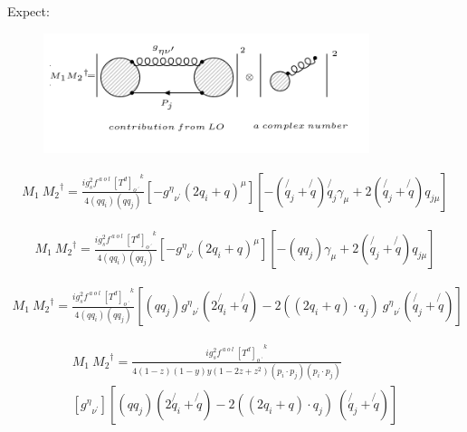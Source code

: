 Expect:
\begin{figure}[h!]
\centering
\includegraphics[width=0.85\textwidth]{images/expectationM1M2daggerggq.png}
\end{figure}
\pagebreak
\begin{equation}
\begin{split}
M_1\:{M_2}^{\dagger}=\frac{ig_s ^2 f^{\:a\:o\:l}\: {[T^d]_{o\:^{\prime}}}^k}{4(qq_i)(qq_j)}
[-{g^{{\eta}}}_{{\nu}^{\prime}}(2q_i +q)^{\mu}]
[-(\not{q_j} + \not{q})\not{q_j}\gamma_{{\mu}} +2(\not{q_j} + \not{q}){q}_{j\mu}]
\end{split}
\end{equation}

\begin{equation}
\begin{split}
M_1\:{M_2}^{\dagger}=\frac{ig_s ^2 f^{\:a\:o\:l}\: {[T^d]_{o\:^{\prime}}}^k}{4(qq_i)(qq_j)}
[-{g^{{\eta}}}_{{\nu}^{\prime}}(2q_i +q)^{\mu}]
[-(qq_j)\gamma_{{\mu}} +2(\not{q_j} + \not{q}){q}_{j\mu}]
\end{split}
\end{equation}

\begin{equation}
\begin{split}
M_1\:{M_2}^{\dagger}=\frac{ig_s ^2 f^{\:a\:o\:l}\: {[T^d]_{o\:^{\prime}}}^k}{4(qq_i)(qq_j)}
[(qq_j){g^{{\eta}}}_{{\nu}^{\prime}}(2\not{q_i} +\not{q})-2((2q_i +q)\cdot{q_j})\:{g^{{\eta}}}_{{\nu}^{\prime}}(\not{q_j} + \not{q})]
\end{split}
\end{equation}

\begin{equation}
\begin{split}
M_1\:{M_2}^{\dagger}=\frac{ig_s ^2 f^{\:a\:o\:l}\: {[T^d]_{o\:^{\prime}}}^k}{4(1-z)(1-y)y(1-2z+z^2)(p_i \cdot p_j)(p_i \cdot p_j)}\\
[{g^{{\eta}}}_{{\nu}^{\prime}}][(qq_j)(2\not{q_i} +\not{q})-2((2q_i +q)\cdot{q_j})\:(\not{q_j} + \not{q})]
\end{split}
\end{equation}

